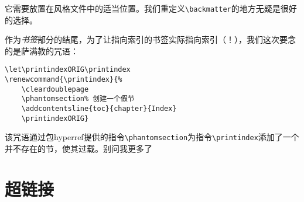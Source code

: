 它需要放置在风格文件中的适当位置。我们重定义\verb|\backmatter|的地方无疑是很好的选择。

\begin{qquestion}
作为\emph{书签}部分的结尾，为了让指向索引的书签实际指向索引（！），我们这次要念的是萨满教的咒语：

\begin{dmd}
\begin{verbatim}
\let\printindexORIG\printindex 
\renewcommand{\printindex}{%
    \cleardoublepage
    \phantomsection% 创建一个假节
    \addcontentsline{toc}{chapter}{Index} 
    \printindexORIG}
\end{verbatim}
\end{dmd}

该咒语通过包hyperref提供的指令\verb|\phantomsection|为指令\verb|\printindex|添加了一个并不存在的节，使其过载。别问我更多了\dm{:-)}
\end{qquestion}

\section{超链接}

